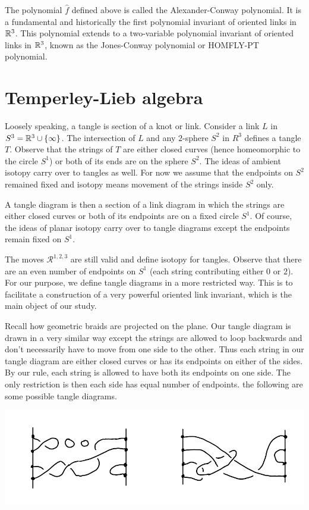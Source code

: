 The polynomial $\hat{f}$ defined above is called the Alexander-Conway polynomial. It is a fundamental and historically the first polynomial invariant of oriented links in $\mathbb{R}^3$. This polynomial extends to a two-variable polynomial invariant of oriented links in $\mathbb{R}^3$, known as the Jones-Conway polynomial or HOMFLY-PT polynomial.

\section{Temperley-Lieb algebra}

Loosely speaking, a tangle is section of a knot or link. Consider a link $L$ in $S^3 = \mathbb{R}^3 \cup \{\infty\}$. The intersection of $L$ and any $2$-sphere $S^2$ in $R^3$ defines a tangle $T$. Observe that the strings of $T$ are either closed curves (hence homeomorphic to the circle $S^1$) or both of its ends are on the sphere $S^2$. The ideas of ambient isotopy carry over to tangles as well. For now we assume that the endpoints on $S^2$ remained fixed and isotopy means movement of the strings inside $S^2$ only.

A tangle diagram is then a section of a link diagram in which the strings are either closed curves or both of its endpoints are on a fixed circle $S^1$. Of course, the ideas of planar isotopy carry over to tangle diagrams except the endpoints remain fixed on $S^1$.

The moves $\mathcal{R}^{1,2,3}$ are still valid and define isotopy for tangles. Observe that there are an even number of endpoints on $S^1$ (each string contributing either $0$ or $2$). For our purpose, we define tangle diagrams in a more restricted way. This is to facilitate a construction of a very powerful oriented link invariant, which is the main object of our study.

  Recall how geometric braids are projected on the plane. Our tangle diagram is drawn in a very similar way except the strings are allowed to loop backwards and don’t necessarily have to move from one side to the other. Thus each string in our tangle diagram are either closed curves or has its endpoints on either of the sides. By our rule, each string is allowed to have both its endpoints on one side. The only restriction is then each side has equal number of endpoints. the following are some possible tangle diagrams.
  
\begin{center}
  \includegraphics[scale=.25]{images/8.png}
\end{center}

